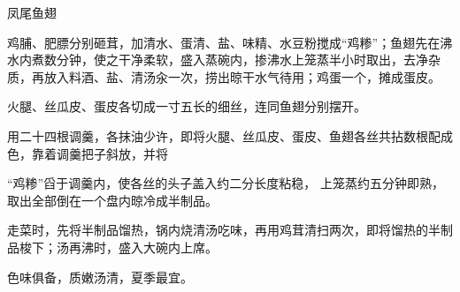 \begin{recipe}{凤尾鱼翅}

\ingredients



\cooking

\step 鸡脯、肥膘分别砸茸，加清水、蛋清、盐、味精、水豆粉搅成“鸡糁”；鱼翅先在沸水内煮数分钟，使之干净柔软，盛入蒸碗内，掺沸水上笼蒸半小时取出，去净杂质，再放入料酒、盐、清汤汆一次，捞出晾干水气待用；鸡蛋一个，摊成蛋皮。

\step 火腿、丝瓜皮、蛋皮各切成一寸五长的细丝，连同鱼翅分别摆开。

\step 用二十四根调羹，各抹油少许，即将火腿、丝瓜皮、蛋皮、鱼翅各丝共拈数根配成色，靠着调羹把子斜放，并将

“鸡糁”舀于调羹内，使各丝的头子盖入约二分长度粘稳， 上笼蒸约五分钟即熟，取出全部倒在一个盘内晾冷成半制品。

\step 走菜时，先将半制品馏热，锅内烧清汤吃味，再用鸡茸清扫两次，即将馏热的半制品梭下；汤再沸时，盛入大碗内上席。

\notes

色味俱备，质嫩汤清，夏季最宜。

\end{recipe}

